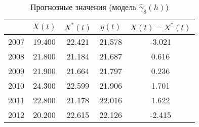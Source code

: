 \begin{table}[ht]
\centering
\caption{Прогнозные значения (модель $ \widehat{\gamma}_8(h) $)} 
\label{table:auto-class-26-prediction}
\begin{tabular}{r|cccc}
  \hline
 & $X(t)$ & $X^{*}(t)$ & $y(t)$ & $ X(t) - X^{*}(t) $ \\ 
  \hline
2007 & 19.400 & 22.421 & 21.578 & -3.021 \\ 
  2008 & 21.800 & 21.184 & 21.687 & 0.616 \\ 
  2009 & 21.900 & 21.664 & 21.797 & 0.236 \\ 
  2010 & 24.300 & 22.599 & 21.906 & 1.701 \\ 
  2011 & 22.800 & 21.178 & 22.016 & 1.622 \\ 
  2012 & 20.200 & 22.615 & 22.126 & -2.415 \\ 
   \hline
\end{tabular}
\end{table}
